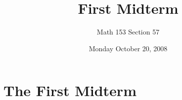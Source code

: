 \documentclass[12pt]{article}
\title{First Midterm}
\author{Math 153 Section 57}
\date{Monday October 20, 2008}
\begin{document}
\maketitle

\section{The First Midterm}
\end{document}
